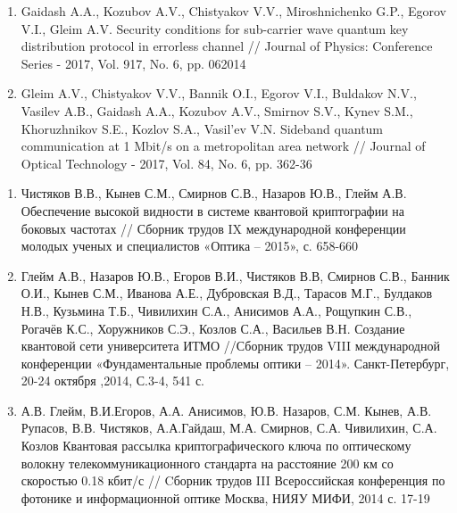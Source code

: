 {\begin{refsection}
\begin{enumerate}
\\
\item Gaidash A.A., Kozubov A.V., Chistyakov V.V., Miroshnichenko G.P., Egorov V.I., Gleim A.V. Security conditions for sub-carrier wave quantum key distribution protocol in errorless channel // Journal of Physics: Conference Series - 2017, Vol. 917, No. 6, pp. 062014
\\
\item  Gleim A.V., Chistyakov V.V., Bannik O.I., Egorov V.I., Buldakov N.V., Vasilev A.B., Gaidash A.A., Kozubov A.V., Smirnov S.V., Kynev S.M., Khoruzhnikov S.E., Kozlov S.A., Vasil'ev V.N. Sideband quantum communication at 1 Mbit/s on a metropolitan area network // Journal of Optical Technology - 2017, Vol. 84, No. 6, pp. 362-36
\\

\end{enumerate}
\begin{enumerate}\addtolength{\itemsep}{-0.5\baselineskip}
\renewcommand{\labelenumi}{[\theenumi]}
\setcounter{enumi}{9}
\item   Чистяков В.В., Кынев С.М., Смирнов С.В., Назаров Ю.В., Глейм А.В. Обеспечение высокой видности в системе квантовой криптографии на боковых частотах // Сборник трудов IX международной конференции молодых ученых и специалистов «Оптика – 2015», с. 658-660
\\
\item Глейм А.В., Назаров Ю.В., Егоров В.И., Чистяков В.В, Смирнов С.В., Банник О.И., Кынев С.М., Иванова А.Е., Дубровская В.Д., Тарасов М.Г., Булдаков Н.В., Кузьмина Т.Б., Чивилихин С.А., Анисимов А.А., Рощупкин С.В., Рогачёв К.С., Хоружников С.Э., Козлов С.А., Васильев В.Н. Создание квантовой сети университета ИТМО //Сборник трудов VIII международной конференции «Фундаментальные проблемы оптики – 2014». Санкт-Петербург, 20-24 октября ,2014, С.3-4,  541 с. 
\\
\item А.В. Глейм, В.И.Егоров, А.А. Анисимов, Ю.В. Назаров, С.М. Кынев, А.В. Рупасов, В.В. Чистяков, А.А.Гайдаш, М.А. Смирнов, С.А. Чивилихин, С.А. Козлов Квантовая рассылка криптографического ключа по оптическому волокну телекоммуникационного стандарта на расстояние 200 км со скоростью 0.18 кбит/с // Cборник трудов III Всероссийская конференция по фотонике и информационной оптике Москва, НИЯУ МИФИ, 2014 с. 17-19
\\


\end{enumerate}


\end{refsection}}
